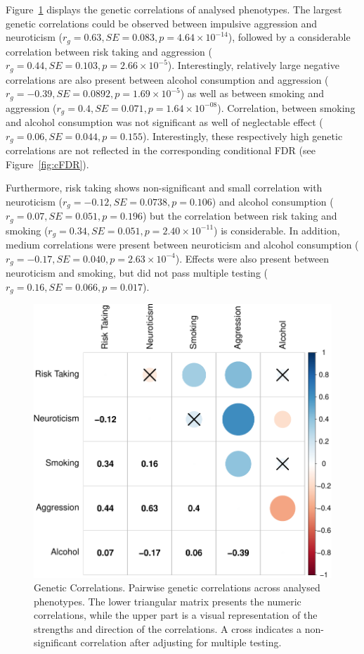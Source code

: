Figure~\ref{fig:gcor} displays the genetic correlations of analysed phenotypes.
The largest genetic correlations could be observed between impulsive aggression and neuroticism ($r_g=0.63, SE=0.083, p=4.64\times 10^{-14}$), 
followed by a considerable correlation between risk taking and aggression ($r_g=0.44, SE=0.103, p=2.66\times 10^{-5}$).
Interestingly, relatively large negative correlations are also present between alcohol consumption and aggression ($r_g=-0.39, SE=0.0892, p=1.69\times 10^{-5}$)
as well as between smoking and aggression ($r_g=0.4, SE=0.071, p=1.64\times 10^{-08}$).
Correlation, between smoking and alcohol consumption was not significant as well of neglectable effect ($r_g=0.06, SE=0.044, p=0.155$).
Interestingly, these respectively high genetic correlations are not reflected in the corresponding conditional FDR (see Figure~\ref{fig:cFDR}).

Furthermore, risk taking shows non-significant and small correlation with neuroticism ($r_g=-0.12, SE=0.0738, p=0.106$) and
alcohol consumption ($r_g=0.07, SE=0.051, p=0.196$) but the correlation between risk taking and smoking ($r_g=0.34, SE=0.051, p=2.40\times 10^{-11}$) is considerable.
In addition, medium correlations were present between neuroticism and alcohol consumption ($r_g=-0.17, SE=0.040, p=2.63\times 10^{-4}$). 
Effects were also present between neuroticism and smoking, but did not pass multiple testing ($r_g=0.16, SE=0.066, p=0.017$).

\begin{figure}[!h]
	\centering
  \includegraphics[width=0.8\linewidth]{ukb_assoc/figure/genetic_corr/gcorr_plot_circle_full_se.pdf}
  \caption[Genetic Correlations]{Genetic Correlations.
    Pairwise genetic correlations across analysed phenotypes.
    The lower triangular matrix presents the numeric correlations, while the upper part is a visual representation of the strengths and direction of the correlations.
    A cross indicates a non-significant correlation after adjusting for multiple testing.
  }\label{fig:gcor}
\end{figure}
